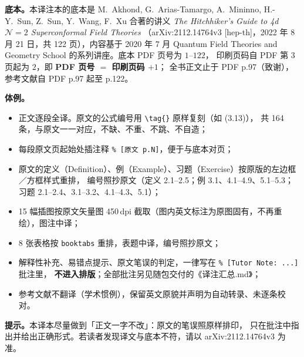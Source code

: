 \noindent\textbf{底本。}本译注本的底本是 M.~Akhond, G.~Arias-Tamargo, A.~Mininno,
H.-Y.~Sun, Z.~Sun, Y.~Wang, F.~Xu 合著的讲义
\emph{The Hitchhiker's Guide to 4d $\mathcal{N}=2$ Superconformal Field Theories}
（arXiv:2112.14764v3 [hep-th]，2022 年 8 月 21 日，共 122 页），内容基于 2020 年 7 月
Quantum Field Theories and Geometry School 的系列讲座。底本 PDF 页号为 $1$--$122$，
印刷页码自 PDF 第 3 页起为 $2$，即 \textbf{PDF 页号 $=$ 印刷页码 $+1$}；
全书正文止于 PDF p.97（致谢），参考文献自 PDF p.97 起至 p.122。

\medskip
\noindent\textbf{体例。}
\begin{itemize}[leftmargin=1.6em,itemsep=2pt]
\item 正文逐段全译。原文的公式编号用 \verb|\tag{}| 原样复刻（如 (3.13)），
      共 164 条，与原文一一对应，不缺、不重、不跳、不自造；
\item 每段原文页起始处插注释 \verb|% [原文 p.N]|，便于与底本对页；
\item 原文的定义（Definition）、例（Example）、习题（Exercise）按原版的左边框／方框样式重排，
      编号照抄原文（定义 2.1--2.5；例 3.1、4.1--4.9、5.1--5.3；习题 2.1--2.4、3.1--3.2、4.1--4.3、5.1）；
\item 15 幅插图按原文矢量图 450\,dpi 截取（图内英文标注为原图固有，不再重绘），图注中译；
\item 8 张表格按 \texttt{booktabs} 重排，表题中译，编号照抄原文；
\item 解释性补充、易错点提示、原文笔误的判定，一律写在 \verb|% [Tutor Note: ...]| 批注里，
      \textbf{不进入排版}；全部批注另见随包交付的《译注汇总.md》；
\item 参考文献不翻译（学术惯例），保留英文原貌并声明为自动转录、未逐条校对。
\end{itemize}

\medskip
\noindent\textbf{提示。}本译本尽量做到「正文一字不改」：原文的笔误照原样排印，
只在批注中指出并给出正确形式。若读者发现译文与底本不符，请以
arXiv:2112.14764v3 为准。

\clearpage
\tableofcontents
\clearpage
